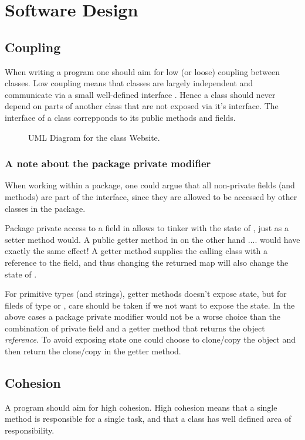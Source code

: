  \section{Software Design}

 \subsection{Coupling}
 When writing a program one should aim for low (or loose) coupling between classes. Low coupling means that classes are largely independent and communicate via a small well-defined interface \cite[p.259]{BK}. Hence a class should never depend on parts of another class that are not exposed via it's interface. The interface of a class correpponds to its public methods and fields.

 \begin{figure}[t]
	\centering
	\caption{UML Diagram for the class Website.}
	\label{fig:uml:single-class-website}
\end{figure}


 \subsubsection{A note about the package private modifier}
 When working within a package, one could argue that all non-private fields (and methods) are part of the interface, since they are allowed to be accessed by other classes in the package. 
 
 Package private access to a field in  allows  to tinker with the state of , just as a setter method would.
 A public getter method in  on the other hand .... would have exactly the same effect!
 A getter method supplies the calling class  with a reference to the field, and thus changing the returned map will also change the state of .
 
 For primitive types (and strings), getter methods doesn't expose state, but for fileds of type   or , care should be taken if we not want to expose the state.
 In the above cases a package private modifier would not be a worse choice than the combination of private field and a getter method that returns the object \emph{reference}. To avoid exposing state one could choose to clone/copy the object and then return the clone/copy in the getter method. 


\subsection{Cohesion}
A program should aim for high cohesion. High cohesion means that a single method is responsible for a single task, and that a class has well defined area of responsibility. 

